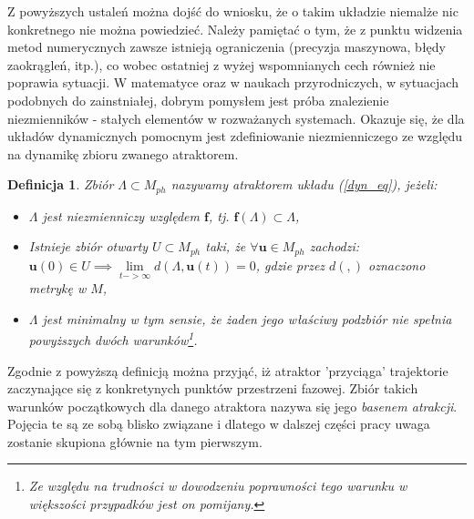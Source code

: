 \documentclass[12pt]{article}
\newtheorem{defi}{Definicja}
\begin{document}
Z powyższych ustaleń można dojść do wniosku, że o takim układzie niemalże nic konkretnego nie można powiedzieć. Należy pamiętać o tym, że z punktu widzenia metod numerycznych zawsze istnieją ograniczenia (precyzja maszynowa, błędy zaokrągleń, itp.), co wobec ostatniej z wyżej wspomnianych cech również nie poprawia sytuacji. W matematyce oraz w naukach przyrodniczych, w sytuacjach podobnych do zainstniałej, dobrym pomysłem jest próba znalezienie niezmienników - stałych elementów w rozważanych systemach. Okazuje się, że dla układów dynamicznych pomocnym jest zdefiniowanie niezmienniczego ze względu na dynamikę zbioru zwanego atraktorem.
\begin{defi}
	Zbiór $\Lambda \subset M_{ph}$ nazywamy atraktorem układu (\ref{dyn_eq}), jeżeli:
	\begin{itemize}
		\item $\Lambda $ jest niezmienniczy względem $ \textbf{f} $, tj. $ \textbf{f}(\Lambda) \subset \Lambda $,
		\item Istnieje zbiór otwarty $ U \subset M_{ph} $ taki, że
		$\forall \textbf{u} \in M_{ph}$ zachodzi: \newline
		$ \textbf{u}(0) \in U  \implies \lim\limits_{t->\infty} d(\Lambda, \textbf{u}(t))=0$, \newline gdzie przez $ d(,) $ oznaczono metrykę w $ M $,
		\item $\Lambda$ jest minimalny w tym sensie, że żaden jego właściwy podzbiór nie spełnia powyższych dwóch warunków\footnote{Ze względu na trudności w dowodzeniu poprawności tego warunku w większości przypadków jest on pomijany.}.
	\end{itemize}  
\end{defi}
Zgodnie z powyższą definicją można przyjąć, iż atraktor 'przyciąga' trajektorie zaczynające się z konkretynych punktów przestrzeni fazowej. Zbiór takich warunków początkowych dla danego atraktora nazywa się jego \textit{basenem atrakcji}. Pojęcia te są ze sobą blisko związane i dlatego w dalszej części pracy uwaga zostanie skupiona głównie na tym pierwszym. \newline
\end{document}
